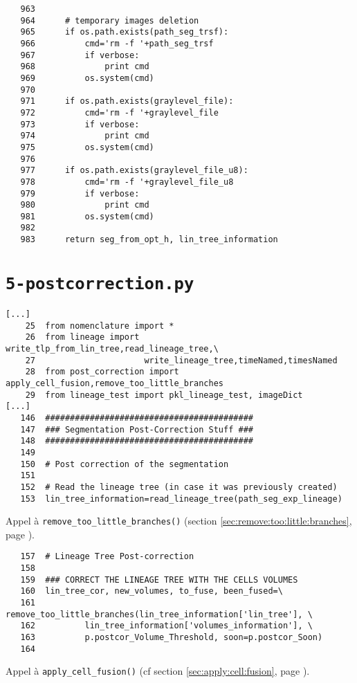 \documentclass{article}
\def \mycolor {red}
\begin{document}
\color{black}
\begin{verbatim}  
   963	
   964	    # temporary images deletion
   965	    if os.path.exists(path_seg_trsf):
   966	        cmd='rm -f '+path_seg_trsf
   967	        if verbose:
   968	            print cmd
   969	        os.system(cmd)
   970	
   971	    if os.path.exists(graylevel_file):
   972	        cmd='rm -f '+graylevel_file
   973	        if verbose:
   974	            print cmd
   975	        os.system(cmd)
   976	
   977	    if os.path.exists(graylevel_file_u8):
   978	        cmd='rm -f '+graylevel_file_u8
   979	        if verbose:
   980	            print cmd
   981	        os.system(cmd)
   982	
   983	    return seg_from_opt_h, lin_tree_information
\end{verbatim}


\pagebreak
\section{\texttt{5-postcorrection.py}}

\begin{verbatim}
[...]
    25	from nomenclature import *
    26	from lineage import write_tlp_from_lin_tree,read_lineage_tree,\
    27						write_lineage_tree,timeNamed,timesNamed
    28	from post_correction import apply_cell_fusion,remove_too_little_branches
    29	from lineage_test import pkl_lineage_test, imageDict
[...]
   146	##########################################
   147	### Segmentation Post-Correction Stuff ###
   148	##########################################
   149	
   150	# Post correction of the segmentation
   151	
   152	# Read the lineage tree (in case it was previously created)
   153	lin_tree_information=read_lineage_tree(path_seg_exp_lineage) 
\end{verbatim} 
\color{\mycolor}
Appel \`a \verb|remove_too_little_branches()| (section \ref{sec:remove:too:little:branches}, page \pageref{sec:remove:too:little:branches}).
\color{black}
\begin{verbatim}  
   157	# Lineage Tree Post-correction
   158	
   159	### CORRECT THE LINEAGE TREE WITH THE CELLS VOLUMES
   160	lin_tree_cor, new_volumes, to_fuse, been_fused=\
   161		remove_too_little_branches(lin_tree_information['lin_tree'], \
   162			lin_tree_information['volumes_information'], \
   163			p.postcor_Volume_Threshold, soon=p.postcor_Soon)
   164	
\end{verbatim} 
\color{\mycolor}
Appel \`a \verb|apply_cell_fusion()| (cf section \ref{sec:apply:cell:fusion}, page \pageref{sec:apply:cell:fusion}).
\end{document}
